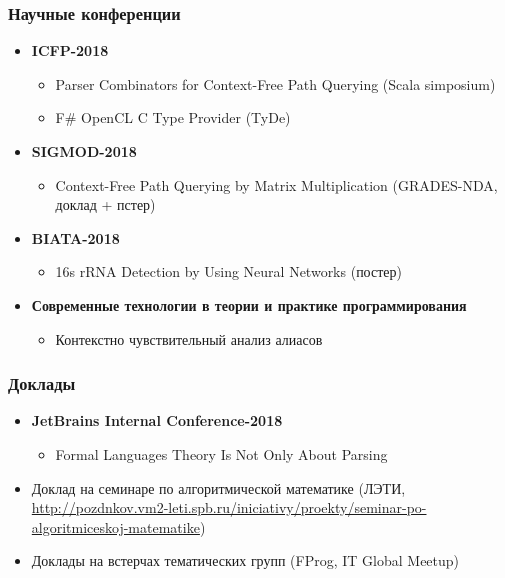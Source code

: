 \documentclass[xcolor=table]{beamer}
\begin{document}
\begin{frame}[fragile]
  \transwipe[direction=90]
  \frametitle{Научные конференции}
\begin{itemize}

      \item \textbf{ICFP-2018}
      \begin{itemize}
        \item Parser Combinators for Context-Free Path Querying (Scala simposium)
        \item F\# OpenCL C Type Provider (TyDe)
      \end{itemize}

      \item \textbf{SIGMOD-2018}
      \begin{itemize}
        \item Context-Free Path Querying by Matrix Multiplication (GRADES-NDA, доклад + пстер)
      \end{itemize}

      \item \textbf{BIATA-2018}
      \begin{itemize}
         \item 16s rRNA Detection by Using Neural Networks (постер)
      \end{itemize}
      
      \item \textbf{Современные технологии в теории и практике программирования}
      \begin{itemize}
         \item Контекстно чувствительный анализ алиасов
      \end{itemize}

\end{itemize}
\end{frame}
 
\begin{frame}[fragile]
  \transwipe[direction=90]
  \frametitle{Доклады}
\begin{itemize}

      \item \textbf{JetBrains Internal Conference-2018}
      \begin{itemize}
        \item Formal Languages Theory Is Not Only About Parsing
      \end{itemize}

      \item Доклад на семинаре по алгоритмической математике (ЛЭТИ, \url{http://pozdnkov.vm2-leti.spb.ru/iniciativy/proekty/seminar-po-algoritmiceskoj-matematike})

      \item Доклады на встерчах тематических групп (FProg, IT Global Meetup)

\end{itemize}
\end{frame}
\end{document}
